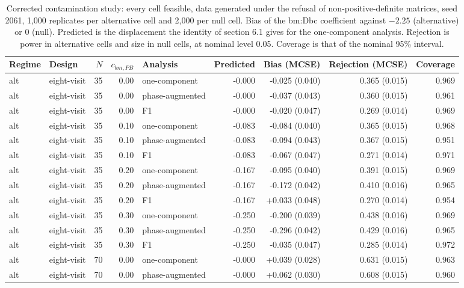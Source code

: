 \documentclass[
  11pt,
]{article}
\begin{document}
\begin{longtable}[t]{llrrlrrrr}
\caption{\label{tab:study2c}Corrected contamination study: every cell feasible, data generated under the refusal of non-positive-definite matrices, seed 2061, 1,000 replicates per alternative cell and 2,000 per null cell. Bias of the bm:Dbc coefficient against $-2.25$ (alternative) or $0$ (null). Predicted is the displacement the identity of section 6.1 gives for the one-component analysis. Rejection is power in alternative cells and size in null cells, at nominal level 0.05. Coverage is that of the nominal 95\% interval.}\\
\toprule
Regime & Design & $N$ & $c_{bm,PB}$ & Analysis & Predicted & Bias (MCSE) & Rejection (MCSE) & Coverage\\
\midrule
alt & eight-visit & 35 & 0.00 & one-component & -0.000 & -0.025 (0.040) & 0.365 (0.015) & 0.969\\
alt & eight-visit & 35 & 0.00 & phase-augmented & -0.000 & -0.037 (0.043) & 0.360 (0.015) & 0.961\\
alt & eight-visit & 35 & 0.00 & F1 & -0.000 & -0.020 (0.047) & 0.269 (0.014) & 0.969\\
alt & eight-visit & 35 & 0.10 & one-component & -0.083 & -0.084 (0.040) & 0.365 (0.015) & 0.968\\
alt & eight-visit & 35 & 0.10 & phase-augmented & -0.083 & -0.094 (0.043) & 0.367 (0.015) & 0.951\\
\addlinespace
alt & eight-visit & 35 & 0.10 & F1 & -0.083 & -0.067 (0.047) & 0.271 (0.014) & 0.971\\
alt & eight-visit & 35 & 0.20 & one-component & -0.167 & -0.095 (0.040) & 0.391 (0.015) & 0.969\\
alt & eight-visit & 35 & 0.20 & phase-augmented & -0.167 & -0.172 (0.042) & 0.410 (0.016) & 0.965\\
alt & eight-visit & 35 & 0.20 & F1 & -0.167 & +0.033 (0.048) & 0.270 (0.014) & 0.954\\
alt & eight-visit & 35 & 0.30 & one-component & -0.250 & -0.200 (0.039) & 0.438 (0.016) & 0.969\\
\addlinespace
alt & eight-visit & 35 & 0.30 & phase-augmented & -0.250 & -0.296 (0.042) & 0.429 (0.016) & 0.965\\
alt & eight-visit & 35 & 0.30 & F1 & -0.250 & -0.035 (0.047) & 0.285 (0.014) & 0.972\\
alt & eight-visit & 70 & 0.00 & one-component & -0.000 & +0.039 (0.028) & 0.631 (0.015) & 0.963\\
alt & eight-visit & 70 & 0.00 & phase-augmented & -0.000 & +0.062 (0.030) & 0.608 (0.015) & 0.960\\

\end{longtable}
\end{document}
